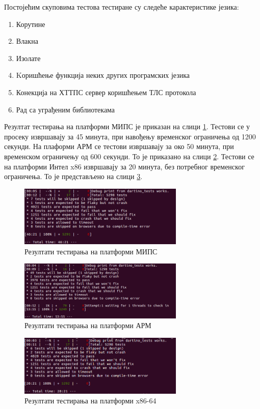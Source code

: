 \documentclass[12pt,oneside]{memoir}
\begin{document}
Постојећим скуповима тестова тестиране су следеће карактеристике језика:
\begin{enumerate}
\item Корутине
\item Влакна
\item Изолате
\item Kоришћење функција неких других програмских језика
\item Конекција на ХТТПС сервер коришћењем ТЛС протокола
\item Рад са уграђеним библиотекама
\end{enumerate}

Резултат тестирања на платформи МИПС је приказан на слици \ref{fig:mips}. Тестови се у просеку извршавају за 45 минута, при навођењу временског ограничења од 1200 секунди.
На плаформи АРМ се тестови извршавају за око 50 минута, при временском ограничењу од 600 секунди. То је приказано на слици \ref{fig:arm}.
Тестови се на платформи Интел x86 извршавају за 20 минута, без потребног временског ограничења. То је представљено на слици \ref{fig:x86}.

\begin{figure}[!ht]
  \centering
  \includegraphics[width=0.7\textwidth]{testovi-mips.png}
  \caption{Резултати тестирања на платформи МИПС}
  \label{fig:mips}
\end{figure}

\begin{figure}[!ht]
  \centering
  \includegraphics[width=0.7\textwidth]{testovi-arm.png}
  \caption{Резултати тестирања на платформи АРМ }
  \label{fig:arm}
\end{figure}

\begin{figure}[!ht]
  \centering
  \includegraphics[width=0.7\textwidth]{testovi_x64.png}
  \caption{Резултати тестирања на платформи x86-64}
  \label{fig:x86}
\end{figure}
\end{document}
